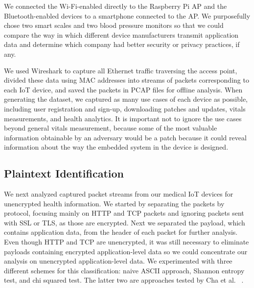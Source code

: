 We connected the Wi-Fi-enabled directly to the Raspberry Pi AP and the Bluetooth-enabled devices to a smartphone connected to the AP.
We purposefully chose two smart scales and two blood pressure monitors so that we could compare the way in which different device manufacturers transmit application data and determine which company had better security or privacy practices, if any. 

We used Wireshark to capture all Ethernet traffic traversing the access point, divided these data using MAC addresses into streams of packets corresponding to each IoT device, and saved the packets in PCAP files for offline analysis. 
 When generating the dataset, we captured as many use cases of each device as possible, including user registration and sign-up, downloading patches and updates, vitals measurements, and health analytics. It is important not to ignore the use cases beyond general vitals measurement, because some of the most valuable information obtainable by an adversary would be a patch because it could reveal information about the way the embedded system in the device is designed. 

\subsection{Plaintext Identification}

We next analyzed captured packet streams from our medical IoT devices for unencrypted health information. We started by separating the packets by protocol, focusing mainly on HTTP and TCP packets and ignoring packets sent with SSL or TLS, as those are encrypted. Next we separated the payload, which contains application data, from the header of each packet for further analysis. Even though HTTP and TCP are unencrypted, it was still necessary to eliminate payloads containing encrypted application-level data so we could concentrate our analysis on unencrypted application-level data. We experimented with three different schemes for this classification: naive ASCII approach, Shannon entropy test, and chi squared test. The latter two are approaches tested by Cha et al. ~\cite{chaMachineLearning}.

